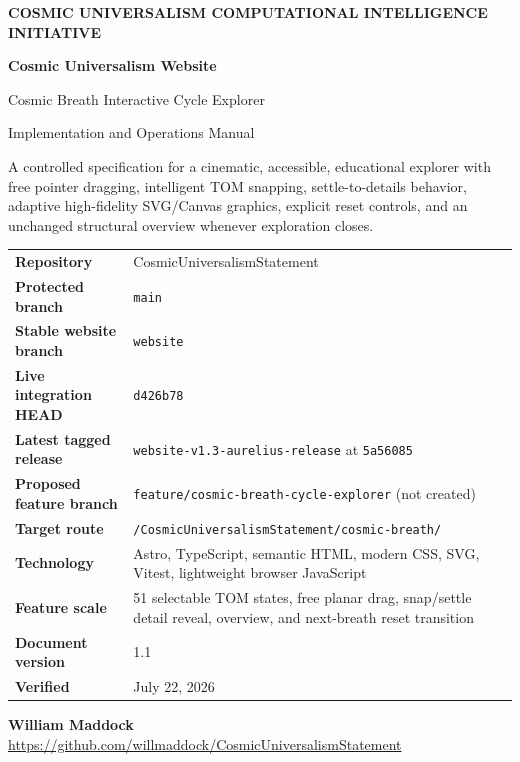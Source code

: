 \documentclass[11pt,letterpaper]{article}
\newcommand{\ProjectTitle}{Cosmic Universalism Website}
\newcommand{\DocumentTitle}{Cosmic Breath Interactive Cycle Explorer}
\newcommand{\DocumentSubtitle}{Implementation and Operations Manual}
\newcommand{\RepositoryName}{CosmicUniversalismStatement}
\newcommand{\RepositoryURL}{https://github.com/willmaddock/CosmicUniversalismStatement}
\newcommand{\ProtectedBranch}{main}
\newcommand{\StableBranch}{website}
\newcommand{\LiveIntegrationHead}{d426b78}
\newcommand{\CurrentReleaseTag}{website-v1.3-aurelius-release}
\newcommand{\CurrentReleaseCommit}{5a56085}
\newcommand{\ProposedFeatureBranch}{feature/cosmic-breath-cycle-explorer}
\newcommand{\TargetRoute}{/CosmicUniversalismStatement/cosmic-breath/}
\newcommand{\DocumentVersion}{1.1}
\newcommand{\VerificationDate}{July 22, 2026}
\newcommand{\AuthorName}{William Maddock}
\begin{document}
\hypersetup{pageanchor=false}
\begin{titlepage}
\pagecolor{CUNavy}\color{white}\thispagestyle{empty}
\vspace*{0.42in}
{\small\bfseries\color{CUCyanLight}COSMIC UNIVERSALISM COMPUTATIONAL INTELLIGENCE INITIATIVE\par}
\vspace{0.28in}
{\Huge\bfseries\ProjectTitle\par}
\vspace{0.13in}
{\LARGE\color{CUGoldLight}\DocumentTitle\par}
\vspace{0.10in}
{\large\color{CUBlueLight}\DocumentSubtitle\par}
\vspace{0.26in}
{\large A controlled specification for a cinematic, accessible, educational explorer with free pointer dragging, intelligent TOM snapping, settle-to-details behavior, adaptive high-fidelity SVG/Canvas graphics, explicit reset controls, and an unchanged structural overview whenever exploration closes.\par}
\vfill
\begin{tcolorbox}[colback=CUNavyTwo,colframe=CUBlue,boxrule=0.8pt,arc=2mm,width=\textwidth]
\color{white}
\begin{tabularx}{\textwidth}{>{\bfseries}L{1.82in}Y}
Repository & \RepositoryName \\
Protected branch & \texttt{\ProtectedBranch} \\
Stable website branch & \texttt{\StableBranch} \\
Live integration HEAD & \texttt{\LiveIntegrationHead} \\
Latest tagged release & \texttt{\CurrentReleaseTag} at \texttt{\CurrentReleaseCommit} \\
Proposed feature branch & \texttt{\ProposedFeatureBranch} (not created) \\
Target route & \texttt{\TargetRoute} \\
Technology & Astro, TypeScript, semantic HTML, modern CSS, SVG, Vitest, lightweight browser JavaScript \\
Feature scale & 51 selectable TOM states, free planar drag, snap/settle detail reveal, overview, and next-breath reset transition \\
Document version & \DocumentVersion \\
Verified & \VerificationDate \\
\end{tabularx}
\end{tcolorbox}
\vspace{0.24in}
{\large\bfseries \AuthorName}
\vspace{0.06in}
{\small\url{\RepositoryURL}}
\end{titlepage}
\hypersetup{pageanchor=true}\nopagecolor\color{CUText}
\end{document}
